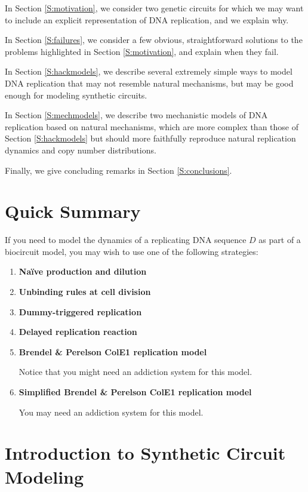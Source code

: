 \documentclass[preprint,12pt]{elsarticle}
\begin{document}
In Section \ref{S:motivation}, we consider two genetic circuits for which we may want to include an explicit representation of DNA replication, and we explain why.

In Section \ref{S:failures}, we consider a few obvious, straightforward solutions to the problems highlighted in Section \ref{S:motivation}, and explain when they fail.

In Section \ref{S:hackmodels}, we describe several extremely simple ways to model DNA replication that may not resemble natural mechanisms, but may be good enough for modeling synthetic circuits.

In Section \ref{S:mechmodels}, we describe two mechanistic models of DNA replication based on natural mechanisms, which are more complex than those of Section \ref{S:hackmodels} but should more faithfully reproduce natural replication dynamics and copy number distributions. 

Finally, we give concluding remarks in Section \ref{S:conclusions}.

\section{Quick Summary}\label{S:quick}

If you need to model the dynamics of a replicating DNA sequence $D$ as part of a biocircuit model, you may wish to use one of the following strategies:

\begin{enumerate}
	\item \textbf{Na\"ive production and dilution}
	\item \textbf{Unbinding rules at cell division}
	\item \textbf{Dummy-triggered replication}
	\item \textbf{Delayed replication reaction}
	\item \textbf{Brendel \& Perelson ColE1 replication model}
	
	Notice that you might need an addiction system for this model. 
	
	\item \textbf{Simplified Brendel \& Perelson ColE1 replication model}	
	
	You may need an addiction system for this model.
\end{enumerate}

\section{Introduction to Synthetic Circuit Modeling}
\label{S:intro}
\end{document}
